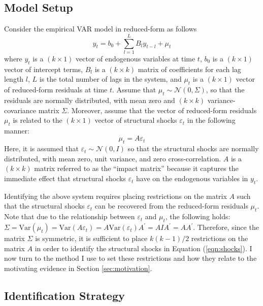 \documentclass[12pt]{article}
\newcommand{\Var}{\mathrm{Var}}
\begin{document}
\subsection{Model Setup}

Consider the empirical VAR model in reduced-form as follows
\begin{equation}\label{eqn:var}
y_t = b_0 + \sum_{l = 1}^L B_l y_{t-l} + \mu_t 
\end{equation}
where $y_t$ is a $(k \times 1)$ vector of endogenous variables at time $t$, $b_0$ is a $(k \times 1)$ vector of intercept terms, $B_l$ is a $(k \times k)$ matrix of coefficients for each lag length $l$, $L$ is the total number of lags in the system, and $\mu_t$ is a $(k \times 1)$ vector of reduced-form residuals at time $t$. Assume that $\mu_t \sim \mathcal{N}(0,\Sigma)$, so that the residuals are normally distributed, with mean zero and $(k \times k)$ variance-covariance matrix $\Sigma$. Moreover, assume that the vector of reduced-form residuals $\mu_t$ is related to the $(k \times 1)$ vector of structural shocks $\varepsilon_t$ in the following manner: 
\begin{equation}\label{eqn:shocks}
\mu_t = A \varepsilon_t
\end{equation}
Here, it is assumed that $\varepsilon_t \sim \mathcal{N}(0,I)$ so that the structural shocks are normally distributed, with mean zero, unit variance, and zero cross-correlation. $A$ is a $(k \times k)$ matrix referred to as the ``impact matrix'' because it captures the immediate effect that structural shocks $\varepsilon_t$ have on the endogenous variables in $y_t$.

Identifying the above system requires placing restrictions on the matrix $A$ such that the structural shocks $\varepsilon_t$ can be recovered from the reduced-form residuals $\mu_t$. Note that due to the relationship between $\varepsilon_t$ and $\mu_t$, the following holds: $\Sigma = \Var(\mu_t) = \Var(A\varepsilon_t) = A\Var(\varepsilon_t)A^\prime = A I A^\prime = AA^\prime$. Therefore, since the matrix $\Sigma$ is symmetric, it is sufficient to place $k(k-1)/2$ restrictions on the matrix $A$ in order to identify the structural shocks in Equation (\ref{eqn:shocks}). I now turn to the method I use to set these restrictions and how they relate to the motivating evidence in Section \ref{sec:motivation}.

\subsection{Identification Strategy}
\end{document}
